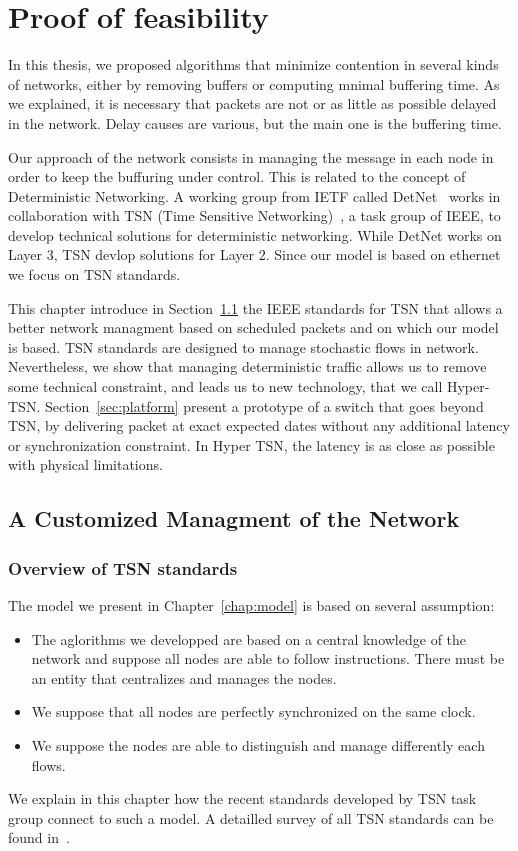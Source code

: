 
\chapter{Proof of feasibility}
\label{chap:TSN}
\minitoc

In this thesis, we proposed algorithms that minimize contention in several kinds of networks, either by removing buffers or computing mnimal buffering time. As we explained, it is necessary that packets are not or as little as possible delayed in the network. Delay causes are various, but the main one is the buffering time. 

Our approach of the network consists in managing the message in each node in order to keep the buffuring under control. This is related to the concept of Deterministic Networking. A working group from IETF called DetNet~\cite{finn-detnet-architecture-08} works in collaboration with TSN (Time Sensitive Networking)~\cite{ieee802}, a task group of IEEE, to develop technical solutions for deterministic networking. While DetNet works on Layer 3, TSN devlop solutions for Layer 2. Since our model is based on ethernet we focus on TSN standards.

This chapter introduce in Section~\ref{sec:TSNqbv} the IEEE standards for TSN that allows a better network managment based on scheduled packets and on which our model is based. TSN standards are designed to manage stochastic flows in network. Nevertheless, we show that managing deterministic traffic allows us to remove some technical constraint, and leads us to new technology, that we call Hyper-TSN. Section~\ref{sec:platform} present a prototype of a switch that goes beyond TSN, by delivering packet at exact expected dates without any additional latency or synchronization constraint. In Hyper TSN, the latency is as close as possible with physical limitations.


\section{A Customized Managment of the Network}
\label{sec:TSNqbv}

\subsection{Overview of TSN standards}
The model we present in Chapter~\ref{chap:model} is based on several assumption:
\begin{itemize}
\item The aglorithms we developped are based on a central knowledge of the network and suppose all nodes are able to follow instructions. There must be an entity that centralizes and manages the nodes.
\item We suppose that all nodes are perfectly synchronized on the same clock.
\item We suppose the nodes are able to distinguish and manage differently each flows.
\end{itemize}
We explain in this chapter how the recent standards developed by TSN task group connect to such a model. A detailled survey of all TSN standards can be found in~\cite{8458130}. 


